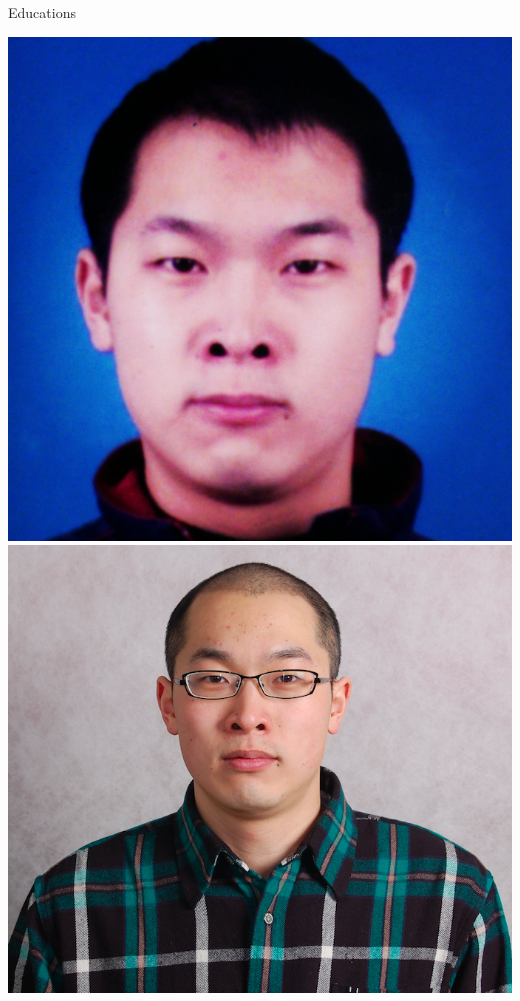 \documentclass[first=dgreen,second=purple,logo=yellowexc]{aaltoslides}
\begin{document}
\begin{frame}{Educations}
	\begin{center}
		\includegraphics[scale = 0.11]{./plots/photo1.jpg}
		\includegraphics[scale = 0.15]{./plots/photo2.png}

\end{center}
\end{frame}
\end{document}
